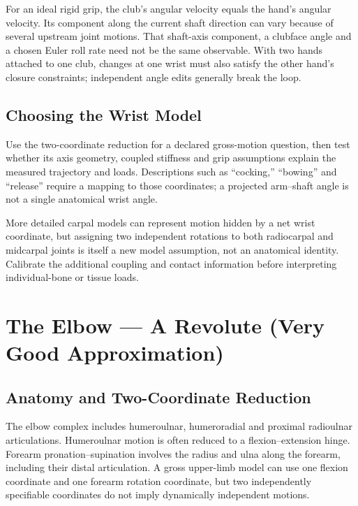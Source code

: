 For an ideal rigid grip, the club's angular velocity equals the hand's angular velocity. Its component along the current shaft direction can vary because of several upstream joint motions. That shaft-axis component, a clubface angle and a chosen Euler roll rate need not be the same observable. With two hands attached to one club, changes at one wrist must also satisfy the other hand's closure constraints; independent angle edits generally break the loop.

\subsection{Choosing the Wrist Model}\label{choosing-the-wrist-model}

Use the two-coordinate reduction for a declared gross-motion question, then test whether its axis geometry, coupled stiffness and grip assumptions explain the measured trajectory and loads. Descriptions such as ``cocking,'' ``bowing'' and ``release'' require a mapping to those coordinates; a projected arm--shaft angle is not a single anatomical wrist angle.

More detailed carpal models can represent motion hidden by a net wrist coordinate, but assigning two independent rotations to both radiocarpal and midcarpal joints is itself a new model assumption, not an anatomical identity. Calibrate the additional coupling and contact information before interpreting individual-bone or tissue loads.

\section{The Elbow --- A Revolute (Very Good Approximation)}\label{sec-elbow_joint}\label{sec:elbow_joint}

\subsection{Anatomy and Two-Coordinate Reduction}\label{anatomy-and-two-coordinate-reduction}

The elbow complex includes humeroulnar, humeroradial and proximal radioulnar articulations. Humeroulnar motion is often reduced to a flexion--extension hinge. Forearm pronation--supination involves the radius and ulna along the forearm, including their distal articulation. A gross upper-limb model can use one flexion coordinate and one forearm rotation coordinate, but two independently specifiable coordinates do not imply dynamically independent motions.

